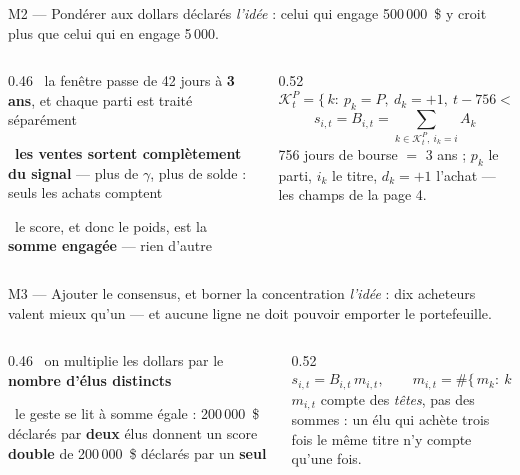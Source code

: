 \documentclass[11pt,aspectratio=169]{beamer}
\newcommand{\obs}[1]{{\color{bleu}\scriptsize\textbullet}~{\scriptsize #1}\par\vspace{0.4mm}}
\newcommand{\lire}[1]{{\scriptsize\color{grisf}#1}}
\begin{document}
\begin{frame}{M2 --- Pondérer aux dollars déclarés}
  \lire{\emph{l'idée} : celui qui engage 500\,000~\$ y croit plus que celui qui en engage 5\,000.}
  \par\vspace{3mm}
  \begin{columns}[T]
    \begin{column}{0.46\textwidth}
      \obs{la fenêtre passe de 42 jours à \textbf{3 ans}, et chaque parti est traité séparément}
      \vspace{2mm}
      \obs{\textbf{les ventes sortent complètement du signal} --- plus de $\gamma$, plus de
       solde : seuls les achats comptent}
      \vspace{2mm}
      \obs{le score, et donc le poids, est la \textbf{somme engagée} --- rien d'autre}
    \end{column}
    \begin{column}{0.52\textwidth}
      {\footnotesize\[ \mathcal K^P_t = \{\, k :\ p_k = P,\ d_k = +1,\
                       t - 756 < \delta_k \leq t \,\} \]}
      \vspace{-1mm}
      {\footnotesize\[ s_{i,t} = B_{i,t} = \sum_{k \in \mathcal K^P_t,\ i_k = i} A_k \]}
      \vspace{1mm}
      \lire{756 jours de bourse $=$ 3 ans ; $p_k$ le parti, $i_k$ le titre, $d_k = +1$ l'achat
       --- les champs de la page 4.}
    \end{column}
  \end{columns}
\end{frame}

\begin{frame}{M3 --- Ajouter le consensus, et borner la concentration}
  \lire{\emph{l'idée} : dix acheteurs valent mieux qu'un --- et aucune ligne ne doit pouvoir
   emporter le portefeuille.}
  \par\vspace{2.5mm}
  \begin{columns}[T]
    \begin{column}{0.46\textwidth}
      \obs{on multiplie les dollars par le \textbf{nombre d'élus distincts}}
      \vspace{1.5mm}
      \obs{le geste se lit à somme égale : 200\,000~\$ déclarés par \textbf{deux} élus donnent un
       score \textbf{double} de 200\,000~\$ déclarés par un \textbf{seul}}
    \end{column}
    \begin{column}{0.52\textwidth}
      {\footnotesize\[ s_{i,t} = B_{i,t}\,m_{i,t}, \qquad
                       m_{i,t} = \#\{\, m_k :\ k \in \mathcal K^P_t,\ i_k = i \,\} \]}
      \vspace{1mm}
      \lire{$m_{i,t}$ compte des \emph{têtes}, pas des sommes : un élu qui achète trois fois le
       même titre n'y compte qu'une fois.}
    \end{column}
  \end{columns}
\end{frame}
\end{document}

